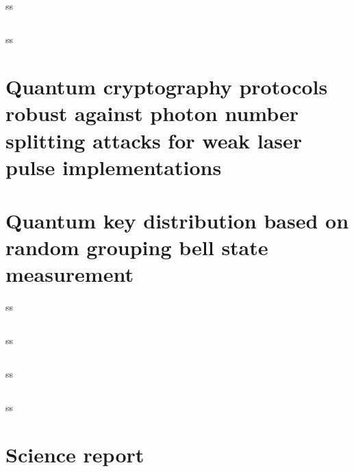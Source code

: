 \subsection*{\review}
ss
\subsection*{\dic}
ss
\section{Quantum cryptography protocols robust against photon number splitting attacks for weak laser pulse implementations}


\section{Quantum key distribution based on random grouping bell state measurement}
ss
\subsection*{\trnas}
ss
\subsection*{\review}
ss
\subsection*{\dic}
ss
\section{Science report}
\blindtext
\clearpage

